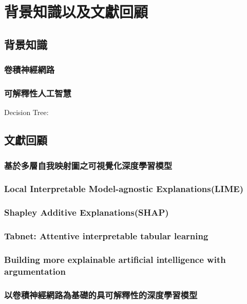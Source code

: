 \documentclass[class=NCU_thesis, crop=false]{standalone}
\begin{document}
\chapter{背景知識以及文獻回顧}
\section{背景知識}
\subsection{卷積神經網路}


\subsection{可解釋性人工智慧}
Decision Tree:
\cite{rokach2016decision}
\cite{grinsztajn2022treebased}




\section{文獻回顧}
\subsection{基於多層自我映射圖之可視覺化深度學習模型}

\subsection{Local Interpretable Model-agnostic Explanations(LIME)}
\subsection{Shapley Additive Explanations(SHAP)}

\subsection{Tabnet: Attentive interpretable tabular learning}
\subsection{Building more explainable artificial intelligence with argumentation}
\subsection{以卷積神經網路為基礎的具可解釋性的深度學習模型}
\end{document}
